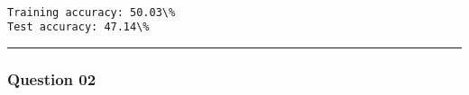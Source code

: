 \documentclass[11pt]{article}
\begin{document}
    \begin{center}
    \end{center}
    { \hspace*{\fill} \\}
    
    \begin{Verbatim}[commandchars=\\\{\}]
Training accuracy: 50.03\%
Test accuracy: 47.14\%
    \end{Verbatim}

    \begin{center}\rule{0.5\linewidth}{0.5pt}\end{center}

\subsubsection{Question 02}\label{question-02}
\end{document}
